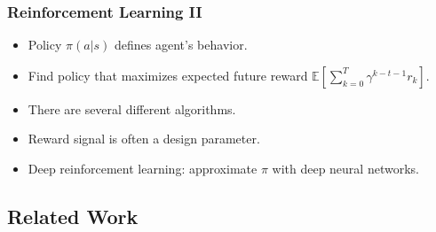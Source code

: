 \begin{frame}
    \frametitle{Reinforcement Learning II}

    \begin{itemize}
        \item Policy \(\pi(a|s)\) defines agent's behavior.
        \item Find policy that maximizes expected future reward \(\mathbb{E} \left\lbrack \sum_{k=0}^{T} \gamma^{k-t-1} r_k \right\rbrack\).
        \item There are several different algorithms.
        \item Reward signal is often a design parameter.
        \item Deep reinforcement learning: approximate \(\pi\) with deep neural networks.
    \end{itemize}

\end{frame}

\subsection{Related Work}

